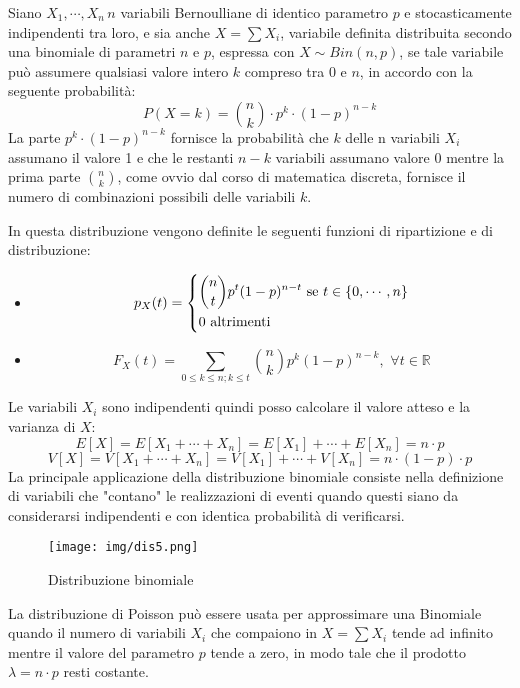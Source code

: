 \documentclass[a4paper,12pt, oneside]{book}
\newcommand{\numberset}{\mathbb}
\newcommand{\R}{\numberset{R}}
\begin{document}
Siano $X_1, \cdots, X_n \,  n$ variabili Bernoulliane di identico parametro $p$ e stocasticamente indipendenti tra loro,
e sia anche $X = \sum X_i$, variabile definita distribuita secondo una binomiale di parametri $n$ e $p$,
espressa con $X \sim Bin(n, p)$, se tale variabile può assumere qualsiasi valore intero $k$ compreso tra 0 e $n$,
in accordo con la seguente probabilità:
\[ P(X = k) = \binom{n}{k} \cdot p^k \cdot (1 - p) ^{n-k} \]
La parte $p^k \cdot (1-p)^{n - k}$ fornisce la probabilità che $k$ delle n variabili $X_i$ assumano il valore 1
e che le restanti $n - k$ variabili assumano valore 0 mentre la prima parte $\binom{n}{k}$, come ovvio dal
corso di matematica discreta, fornisce il numero  di combinazioni possibili delle variabili $k$.

In questa distribuzione vengono definite le seguenti funzioni di ripartizione e di distribuzione:
\begin{itemize}
    \item \[p_X(t) = \begin{dcases}
                        \binom{n}{t} p^t (1-p)^{n-t} \mbox{ se } t \in \{0,\cdots, n\}\\
                        0 \mbox{ altrimenti }\\
                     \end{dcases} \]
    \item \[F_X(t) = \sum_{0 \leq k \leq n; k\leq t} \binom{n}{k} p^k (1-p) ^{n - k},\,\,\forall t \in \R\]
\end{itemize}
Le variabili $X_i$ sono indipendenti quindi posso calcolare il valore atteso e la varianza di $X$:
\[E[X] = E[X_1 + \cdots + X_n] = E[X_1] + \cdots + E[X_n] = n \cdot p\]
\[V[X] = V[X_1 + \cdots + X_n] = V[X_1] + \cdots + V[X_n] = n \cdot (1-p) \cdot p\]
La principale applicazione della distribuzione binomiale consiste nella definizione di variabili che "contano" le 
realizzazioni di eventi quando questi siano da considerarsi indipendenti e con identica probabilità di verificarsi.

\begin{figure}
    \caption{Distribuzione binomiale}
    \label{fig:binomiale}
	\texttt{[image: img/dis5.png]}
\end{figure}
La distribuzione di Poisson può essere usata per approssimare una Binomiale quando il numero di variabili $X_i$ 
che compaiono in $X = \sum X_i$ tende ad infinito mentre il valore del parametro $p$ tende a zero,
in modo tale che il prodotto $\lambda = n\cdot p$ resti costante.\newline
\end{document}
